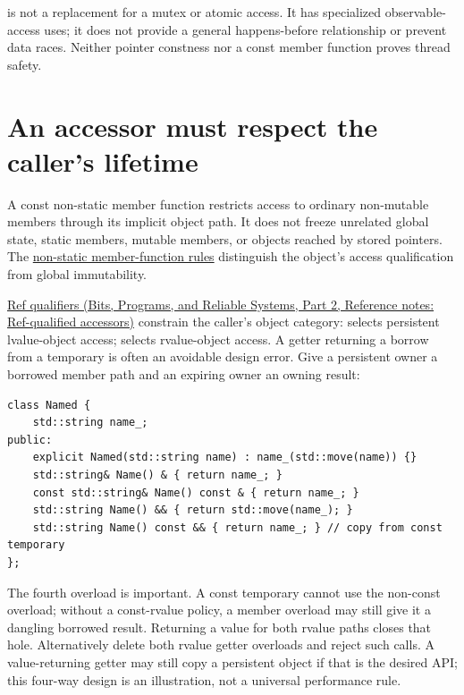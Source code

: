  is not a replacement for a mutex or atomic access. It has specialized observable-access uses; it does not provide a general happens-before relationship or prevent data races. Neither pointer constness nor a const member function proves thread safety.

\section{An accessor must respect the caller's lifetime}\label{05-engine-i-ch003-an-accessor-must-respect-the-callers-lifetime}

\hypertarget{05-engine-i-ch003-an-accessor-must-respect-the-callers-lifetime}{}

A const non-static member function restricts access to ordinary non-mutable members through its implicit object path. It does not freeze unrelated global state, static members, mutable members, or objects reached by stored pointers. The \href{https://eel.is/c++draft/class.mfct.non.static}{non-static member-function rules} distinguish the object's access qualification from global immutability.

\href{../01-Bits-Programs-and-Reliable-Systems-P02/main.pdf\#nameddest=appendix-d42039b1d6f7}{Ref qualifiers (Bits, Programs, and Reliable Systems, Part 2, Reference notes: Ref-qualified accessors)} constrain the caller's object category: \BookInlineCode{{\&}}{\&} selects persistent lvalue-object access; \BookInlineCode{{\&}{\&}}{\&\&} selects rvalue-object access. A getter returning a borrow from a temporary is often an avoidable design error. Give a persistent owner a borrowed member path and an expiring owner an owning result:

\begin{verbatim}
class Named {
    std::string name_;
public:
    explicit Named(std::string name) : name_(std::move(name)) {}
    std::string& Name() & { return name_; }
    const std::string& Name() const & { return name_; }
    std::string Name() && { return std::move(name_); }
    std::string Name() const && { return name_; } // copy from const temporary
};
\end{verbatim}

The fourth overload is important. A const temporary cannot use the non-const \BookInlineCode{{\&}{\&}}{\&\&} overload; without a const-rvalue policy, a  member overload may still give it a dangling borrowed result. Returning a value for both rvalue paths closes that hole. Alternatively delete both rvalue getter overloads and reject such calls. A value-returning getter may still copy a persistent object if that is the desired API; this four-way design is an illustration, not a universal performance rule.

